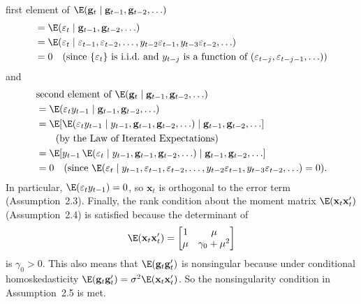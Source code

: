 \medskip
\noindent first element of $\E(\mathbf{g}_t \mid \mathbf{g}_{t-1}, \mathbf{g}_{t-2}, \ldots)$
\begin{align*}
  &= \E(\varepsilon_t \mid \mathbf{g}_{t-1}, \mathbf{g}_{t-2}, \ldots) \\
  &= \E(\varepsilon_t \mid \varepsilon_{t-1}, \varepsilon_{t-2}, \ldots, y_{t-2}\varepsilon_{t-1}, y_{t-3}\varepsilon_{t-2}, \ldots) \\
  &= 0 \quad (\text{since $\{\varepsilon_t\}$ is i.i.d.\ and $y_{t-j}$ is a function of $(\varepsilon_{t-j}, \varepsilon_{t-j-1}, \ldots)$})
\end{align*}
and
\begin{align}
  &\text{second element of } \E(\mathbf{g}_t \mid \mathbf{g}_{t-1}, \mathbf{g}_{t-2}, \ldots) \notag \\
  &= \E(\varepsilon_t y_{t-1} \mid \mathbf{g}_{t-1}, \mathbf{g}_{t-2}, \ldots) \notag \\
  &= \E[\E(\varepsilon_t y_{t-1} \mid y_{t-1}, \mathbf{g}_{t-1}, \mathbf{g}_{t-2}, \ldots) \mid \mathbf{g}_{t-1}, \mathbf{g}_{t-2}, \ldots] \notag \\
  &\qquad \text{(by the Law of Iterated Expectations)} \notag \\
  &= \E[y_{t-1}\,\E(\varepsilon_t \mid y_{t-1}, \mathbf{g}_{t-1}, \mathbf{g}_{t-2}, \ldots) \mid \mathbf{g}_{t-1}, \mathbf{g}_{t-2}, \ldots] \notag \\
  &= 0 \quad (\text{since } \E(\varepsilon_t \mid y_{t-1}, \varepsilon_{t-1}, \varepsilon_{t-2}, \ldots, y_{t-2}\varepsilon_{t-1}, y_{t-3}\varepsilon_{t-2}, \ldots) = 0).
  \label{eq:6.4.3}
\end{align}
In particular, $\E(\varepsilon_t y_{t-1}) = 0$, so $\mathbf{x}_t$ is orthogonal to the error term (Assumption~2.3).
Finally, the rank condition about the moment matrix $\E(\mathbf{x}_t \mathbf{x}_t')$ (Assumption~2.4) is
satisfied because the determinant of
\begin{equation}
  \E(\mathbf{x}_t \mathbf{x}_t') =
  \begin{bmatrix} 1 & \mu \\ \mu & \gamma_0 + \mu^2 \end{bmatrix}
  \label{eq:6.4.4}
\end{equation}
is $\gamma_0 > 0$. This also means that $\E(\mathbf{g}_t \mathbf{g}_t')$ is nonsingular because under conditional
homoskedasticity $\E(\mathbf{g}_t \mathbf{g}_t') = \sigma^2 \E(\mathbf{x}_t \mathbf{x}_t')$. So the nonsingularity condition
in Assumption~2.5 is met.

